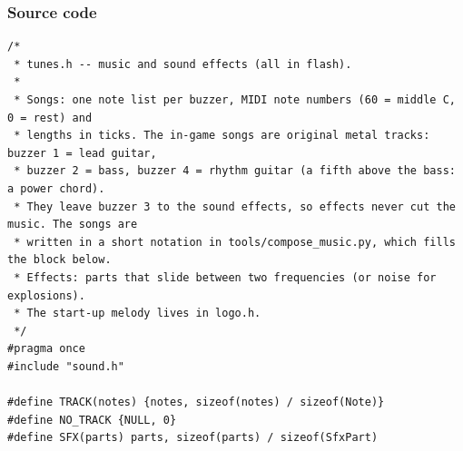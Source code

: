 \documentclass[11pt,a4paper]{article}
\begin{document}
\subsubsection*{Source code}
\begin{lstlisting}[language=Arduino]
/*
 * tunes.h -- music and sound effects (all in flash).
 *
 * Songs: one note list per buzzer, MIDI note numbers (60 = middle C, 0 = rest) and
 * lengths in ticks. The in-game songs are original metal tracks: buzzer 1 = lead guitar,
 * buzzer 2 = bass, buzzer 4 = rhythm guitar (a fifth above the bass: a power chord).
 * They leave buzzer 3 to the sound effects, so effects never cut the music. The songs are
 * written in a short notation in tools/compose_music.py, which fills the block below.
 * Effects: parts that slide between two frequencies (or noise for explosions).
 * The start-up melody lives in logo.h.
 */
#pragma once
#include "sound.h"

#define TRACK(notes) {notes, sizeof(notes) / sizeof(Note)}
#define NO_TRACK {NULL, 0}
#define SFX(parts) parts, sizeof(parts) / sizeof(SfxPart)


\end{lstlisting}
\end{document}
